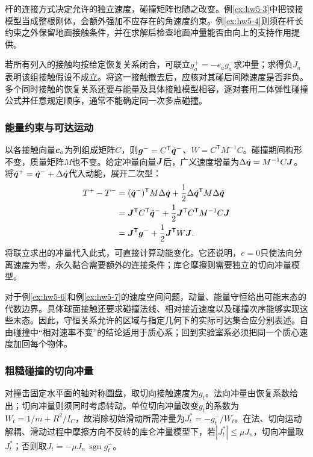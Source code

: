 杆的连接方式决定允许的独立速度，碰撞矩阵也随之改变。例\ref{ex:hw5-3}中把铰接模型当成整根刚体，会额外强加不应存在的角速度约束。例\ref{ex:hw5-4}则须在杆长约束之外保留地面接触条件，并在求解后检查地面冲量能否由向上的支持作用提供。

若所有列入的接触均按给定恢复关系闭合，可联立$g_a^+=-e_ag_a^-$求冲量；求得负$J_a$表明该组接触假设不成立。将这一接触撤去后，应核对其碰后间隙速度是否非负。多个同时接触的恢复关系还要与能量及具体接触模型相容，逐对套用二体弹性碰撞公式并任意规定顺序，通常不能确定同一次多点碰撞。

\subsubsection{能量约束与可达运动}
以各接触向量$\bm{c}_a$为列组成矩阵$C$，则$\bm{g}^-=C^{\mathsf T}\dot{\bm{q}}^-$、$W=C^{\mathsf T}M^{-1}C$。碰撞期间构形不变，质量矩阵$M$也不变。给定冲量向量$\bm{J}$后，广义速度增量为$\Delta\dot{\bm{q}}=M^{-1}C\bm{J}$。将$\dot{\bm{q}}^+=\dot{\bm{q}}^-+\Delta\dot{\bm{q}}$代入动能，展开二次型：
\begin{align*}
 T^+-T^-&=(\dot{\bm{q}}^-)^{\mathsf T}M\Delta\dot{\bm{q}}
 +\frac12\Delta\dot{\bm{q}}^{\mathsf T}M\Delta\dot{\bm{q}}\\
 &=\bm{J}^{\mathsf T}C^{\mathsf T}\dot{\bm{q}}^-
 +\frac12\bm{J}^{\mathsf T}C^{\mathsf T}M^{-1}C\bm{J}\\
 &=\bm{J}^{\mathsf T}\bm{g}^-+\frac12\bm{J}^{\mathsf T}W\bm{J}.
\end{align*}
将联立求出的冲量代入此式，可直接计算动能变化。它还说明，$e=0$只使法向分离速度为零，永久黏合需要额外的连接条件；库仑摩擦则需要独立的切向冲量模型。

对于例\ref{ex:hw5-6}和例\ref{ex:hw5-7}的速度空间问题，动量、能量守恒给出可能末态的代数边界。具体球面接触还要求碰撞法线、相对接近速度以及碰撞次序能够实现这些末态。因此，守恒关系允许的区域与指定几何下的实际可达集合应分别表述。自由碰撞中“相对速率不变”的结论适用于质心系；回到实验室系必须把同一个质心速度加回每个物体。

\subsubsection{粗糙碰撞的切向冲量}\label{sup5:sec:d4-rough}
对撞击固定水平面的轴对称圆盘，取切向接触速度为$g_t$。法向冲量由恢复系数给出；切向冲量则须同时考虑转动。单位切向冲量改变$g_t$的系数为$W_t=1/m+R^2/I_C$，故消除初始滑动所需冲量为$J_t^*=-g_t^-/W_t$。在法、切向运动解耦、滑动过程中摩擦方向不反转的库仑冲量模型下，若$|J_t^*|\le\mu J_n$，切向冲量取$J_t^*$；否则取$J_t=-\mu J_n\,\operatorname{sgn}g_t^-$。

